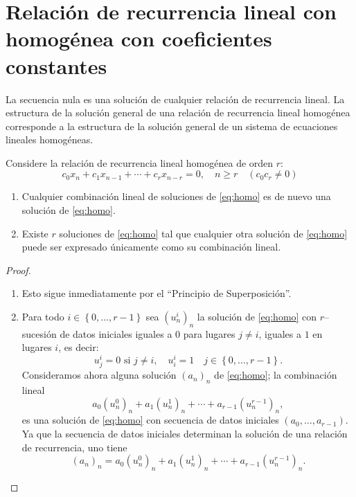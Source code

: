 \section{Relación de recurrencia lineal con homogénea con coeficientes constantes}

La secuencia nula es una solución de cualquier relación de recurrencia lineal. La estructura de la solución general de una relación de recurrencia lineal homogénea corresponde a la estructura de la solución general de un sistema de ecuaciones lineales homogéneas.
\begin{proposition}
	Considere la relación de recurrencia lineal homogénea de orden $r$:
	\begin{equation}\label{eq:homo}
	c_{0}x_{n}+c_{1}x_{n-1}+\cdots+c_{r}x_{n-r}=0,\quad n\geq r\quad\left(c_{0}c_{r}\neq0\right)
	\end{equation}
	\begin{enumerate}
		\item Cualquier combinación lineal de soluciones de \eqref{eq:homo} es de nuevo una solución de \eqref{eq:homo}.
		\item Existe $r$ soluciones de \eqref{eq:homo} tal que cualquier otra solución de \eqref{eq:homo} puede ser expresado únicamente como su combinación lineal.
	\end{enumerate}
\end{proposition}

\begin{proof}\leavevmode
	\begin{enumerate}
		\item Esto sigue inmediatamente por el ``Principio de Superposición''.
		\item Para todo $i\in\left\{0,\ldots,r-1 \right\}$ sea $\left(u^{i}_{n}\right)_{n}$ la solución de \eqref{eq:homo} con $r$--sucesión de datos iniciales iguales a $0$ para lugares $j\neq i$, iguales a $1$ en lugares $i$, es decir: \[ u^{i}_{j}=0\text{ si }j\neq i,\quad u^{i}_{i}=1\quad j\in\left\{0,\ldots,r-1 \right\}. \]
		Consideramos ahora alguna solución $(a_{n})_{n}$ de \eqref{eq:homo}; la combinación lineal \[ a_{0}{\left(u^{0}_{n}\right)}_{n}+a_{1}{\left(u^{1}_{n}\right)}_{n}+\cdots+a_{r-1}(u^{r-1}_{n})_{n}, \]	es una solución de \eqref{eq:homo} con secuencia de datos iniciales $\left(a_{0},\ldots,a_{r-1}\right)$. Ya que la secuencia de datos iniciales determinan la solución de una relación de recurrencia, uno tiene \[ {\left(a_{n}\right)}_{n}=a_{0}\left(u^{0}_{n}\right)_{n}+a_{1}\left(u^{1}_{n}\right)_{n}+\cdots+a_{r-1}\left(u^{r-1}_{n}\right)_{n}. \]
	\end{enumerate}
\end{proof}

